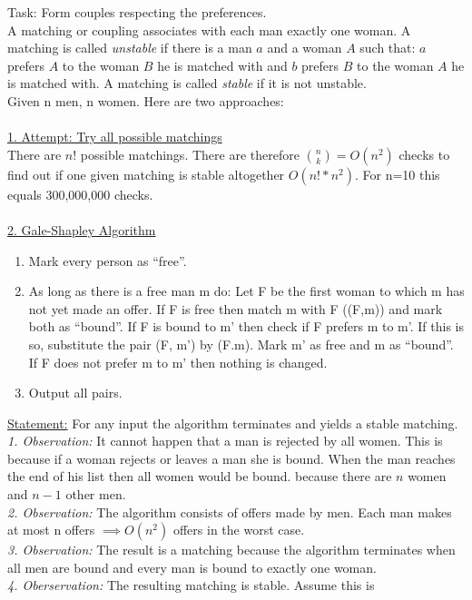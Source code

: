 Task: Form couples respecting the preferences.\\
A matching or coupling associates with each man exactly one woman. A matching is called \emph{unstable} if there is a man $a$ and a woman $A$ such that:
$a$ prefers $A$ to the woman $B$ he is matched with and $b$ prefers $B$ to the woman $A$ he is matched with.
A matching is called \emph{stable} if it is not unstable.\\
Given n men, n women. Here are two approaches:\\\\
\underline{1. Attempt: Try all possible matchings}\\
There are $n!$ possible matchings. There are therefore ${n \choose k} =
O(n^2)$ checks to find out if one given matching is stable altogether $O(n! * n^2)$.
For n=10 this equals 300,000,000 checks.\\\\
\underline{2. Gale-Shapley Algorithm}
\begin{enumerate}
\item{Mark every person as ``free''.}
\item{As long as there is a free man m do: Let F be the first woman to which m has not yet made an offer. If F is 
free then match m with F ((F,m)) and mark both as ``bound''. If F is bound to m' then check if F prefers
m to m'. If this is so, substitute the pair (F, m') by (F.m). Mark m' as free and m as ``bound''.\\If F does not
prefer m to m' then nothing is changed.}
\item{Output all pairs.}
\end{enumerate}
\underline{Statement:} For any input the algorithm terminates and yields a
stable matching.\\
\emph{1. Observation:} It cannot happen that a man is rejected by all
women.
This is because if a woman rejects or leaves a man she is bound.
When the man reaches the end of his list then all women would be bound.
\Lightning because there are $n$ women and $n-1$ other men. \\
\emph{2. Observation:} The algorithm consists of offers made by men. Each
man makes at most n offers $\implies O(n^2)$ offers in the worst case. \\
\emph{3. Observation:} The result is a matching because the algorithm
terminates when all men are bound and every man is bound to exactly one woman. \\
\emph{4. Oberservation:} The resulting matching is stable. Assume this is
